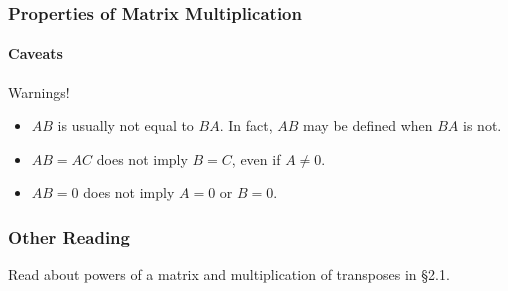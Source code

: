 \begin{frame}
\frametitle{Properties of Matrix Multiplication}
\framesubtitle{Caveats}

\alert{\large Warnings!}
\begin{itemize}
\item $AB$ is usually not equal to $BA$.
  \webonlycmd{
  \[ \mat{0 -1; 1 0}\mat{2 0; 0 1} = \mat{0 -1; 2 0} \qquad
  \mat{2 0; 0 1}\mat{0 -1; 1 0} = \mat{0 -2; 1 0} \]
  }\pause
  In fact, $AB$ may be defined when $BA$ is not.

\pause\medskip
\item $AB = AC$ does not imply $B = C$, even if $A\neq 0$.
  \webonlycmd{
  \[ \mat{1 0; 0 0}\mat{1 2; 3 4} = \mat{1 2; 0 0}
     = \mat{1 0; 0 0}\mat{1 2; 5 6} \]
   }%

\pause
\item $AB = 0$ does not imply $A=0$ or $B=0$.
  \webonlycmd{
  \[ \mat{1 0; 1 0}\mat{0 0; 1 1} 
  = \mat{0 0; 0 0} \]
}

\end{itemize}

\end{frame}



\begin{frame}
\frametitle{Other Reading}

\vfill

\begin{bluebox}{.8\linewidth}
  Read about powers of a matrix and multiplication of transposes in \S2.1.
\end{bluebox}

\vfill

\end{frame}



